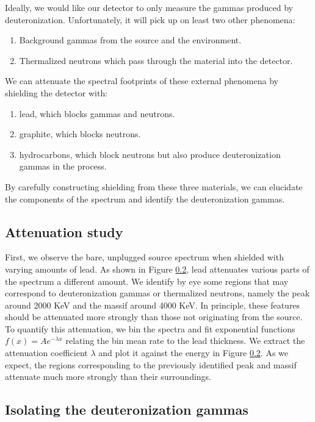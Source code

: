 \documentclass[12pt, letterpaper]{article}
\begin{document}
Ideally, we would like our detector to only measure the gammas produced by deuteronization. Unfortunately, it will pick up on least two other phenomena: 
\begin{enumerate}
    \item Background gammas from the source and the environment. 
    \item Thermalized neutrons which pass through the material into the detector. 
\end{enumerate}
We can attenuate the spectral footprints of these external phenomena by shielding the detector with: 
\begin{enumerate}
    \item lead, which blocks gammas and neutrons. 
    \item graphite, which blocks neutrons. 
    \item hydrocarbons, which block neutrons but also produce deuteronization gammas in the process. 
\end{enumerate}
By carefully constructing shielding from these three materials, we can elucidate the components of the spectrum and identify the deuteronization gammas. 

\subsection{Attenuation study}

First, we observe the bare, unplugged source spectrum when shielded with varying amounts of lead. As shown in Figure \ref{}, lead attenuates various parts of the spectrum a different amount. We identify by eye some regions that may correspond to deuteronization gammas or thermalized neutrons, namely the peak around 2000 KeV and the massif around 4000 KeV. In principle, these features should be attenuated more strongly than those not originating from the source. To quantify this attenuation, we bin the spectra and fit exponential functions $f(x) = Ae^{-\lambda x}$ relating the bin mean rate to the lead thickness. We extract the attenuation coefficient $\lambda$ and plot it against the energy in Figure \ref{}. As we expect, the regions corresponding to the previously identified peak and massif attenuate much more strongly than their surroundings. 

\subsection{Isolating the deuteronization gammas}
\end{document}
